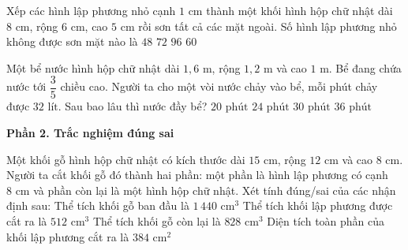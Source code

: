 \begin{ex} %
Xếp các hình lập phương nhỏ cạnh $1\text{ cm}$ thành một khối hình hộp chữ nhật dài $8\text{ cm}$, rộng $6\text{ cm}$, cao $5\text{ cm}$ rồi sơn tất cả các mặt ngoài. Số hình lập phương nhỏ không được sơn mặt nào là
\choice
{$48$}
{\True $72$}
{$96$}
{$60$}
\end{ex}

\begin{ex} %
Một bể nước hình hộp chữ nhật dài $1{,}6\text{ m}$, rộng $1{,}2\text{ m}$ và cao $1\text{ m}$. Bể đang chứa nước tới $\dfrac{3}{5}$ chiều cao. Người ta cho một vòi nước chảy vào bể, mỗi phút chảy được $32\text{ lít}$. Sau bao lâu thì nước đầy bể?
\choice
{$20\text{ phút}$}
{\True $24\text{ phút}$}
{$30\text{ phút}$}
{$36\text{ phút}$}
\end{ex}

\textbf{Phần 2. Trắc nghiệm đúng sai}

\begin{ex} %
Một khối gỗ hình hộp chữ nhật có kích thước dài $15\text{ cm}$, rộng $12\text{ cm}$ và cao $8\text{ cm}$. Người ta cắt khối gỗ đó thành hai phần: một phần là hình lập phương có cạnh $8\text{ cm}$ và phần còn lại là một hình hộp chữ nhật. Xét tính đúng/sai của các nhận định sau:
\choiceTF
{\True Thể tích khối gỗ ban đầu là $1\,440\text{ cm}^3$}
{\True Thể tích khối lập phương được cắt ra là $512\text{ cm}^3$}
{Thể tích khối gỗ còn lại là $828\text{ cm}^3$}
{\True Diện tích toàn phần của khối lập phương cắt ra là $384\text{ cm}^2$}
\end{ex}

